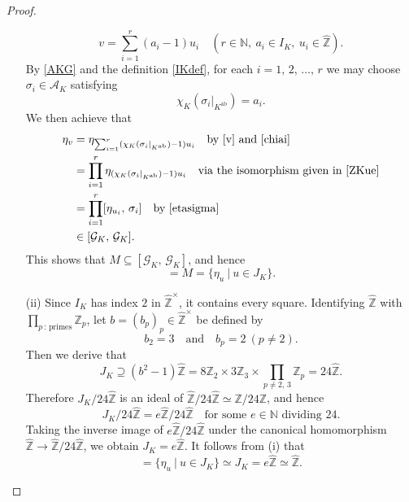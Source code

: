 \documentclass[reqno,11pt]{article}
\theoremstyle{plain} %
\theoremstyle{definition} %
\begin{document}
\begin{proof}
\begin{enumerate}
\begin{equation}\label{v}
v=\sum_{i=1}^r(a_i-1)u_i
\quad(r\in\mathbb{N},~a_i\in I_K,~u_i\in\widehat{\mathbb{Z}}).
\end{equation}
By \eqref{AKG} and the definition \eqref{IKdef}, for each $i=1,\,2,\,\ldots,\,r$ we may choose
$\sigma_i\in\mathcal{A}_K$ satisfying
\begin{equation}\label{chiai}
\chi_K(\sigma_i|_{K^\mathrm{ab}})=a_i.
\end{equation}
We then achieve that
\begin{align*}
\eta_v&=\eta_{\sum_{i=1}^r(\chi_K(\sigma_i|_{K^\mathrm{ab}})-1)u_i}\quad\textrm{by 
\eqref{v} and \eqref{chiai}}\\
&=\prod_{i=1}^r\eta_{(\chi_K(\sigma_i|_{K^\mathrm{ab}})-1)u_i}\quad\textrm{via the isomorphism given in \eqref{ZKue}}\\
&=\prod_{i=1}^r[\eta_{u_i},\,\sigma_i]\quad\textrm{by \eqref{etasigma}}\\
&\in [\mathcal{G}_K,\,\mathcal{G}_K].
\end{align*}
This shows that $M\subseteq[\mathcal{G}_K,\,\mathcal{G}_K]$, and hence
\begin{equation*}
[\mathcal{G}_K,\,\mathcal{G}_K]=M=\{\eta_u~|~u\in J_K\}. 
\end{equation*}
\item[(ii)]
Since $I_K$ has index $2$ in $\widehat{\mathbb{Z}}^{\times}$, it contains every square.
Identifying $\widehat{\mathbb{Z}}$ with 
$\prod_{p\,:\,\textrm{primes}}\mathbb{Z}_p$, 
let $b=(b_p)_p\in\widehat{\mathbb{Z}}^{\times}$ be defined by
\begin{equation*}
b_2=3\quad\textrm{and}\quad
b_p=2~(p\neq2).
\end{equation*}
Then we derive that
\begin{equation*}
J_K\supseteq(b^2-1)\widehat{\mathbb{Z}}=
8\mathbb{Z}_2\times3\mathbb{Z}_3
\times\prod_{p\neq2,\,3}\mathbb{Z}_p=
24\widehat{\mathbb{Z}}.
\end{equation*}
Therefore $J_K/24\widehat{\mathbb{Z}}$ is an ideal of $\widehat{\mathbb{Z}}/24\widehat{\mathbb{Z}}
\simeq\mathbb{Z}/24\mathbb{Z}$, and hence
\begin{equation*}
J_K/24\widehat{\mathbb{Z}}=e\widehat{\mathbb{Z}}/24\widehat{\mathbb{Z}}
\quad\textrm{for some $e\in\mathbb{N}$ dividing $24$}. 
\end{equation*}
Taking the inverse 
image of $e\widehat{\mathbb{Z}}/24\widehat{\mathbb{Z}}$
under the canonical homomorphism $\widehat{\mathbb{Z}}\rightarrow\widehat{\mathbb{Z}}
/24\widehat{\mathbb{Z}}$, 
we obtain $J_K=e\widehat{\mathbb{Z}}$. It follows from (i) that
\begin{equation*}
[\mathcal{G}_K,\,\mathcal{G}_K]=\{\eta_u~|~u\in J_K\}\simeq J_K=e\widehat{\mathbb{Z}}\simeq\widehat{\mathbb{Z}}. 
\end{equation*}
\end{enumerate}
\end{proof}
\end{document}
